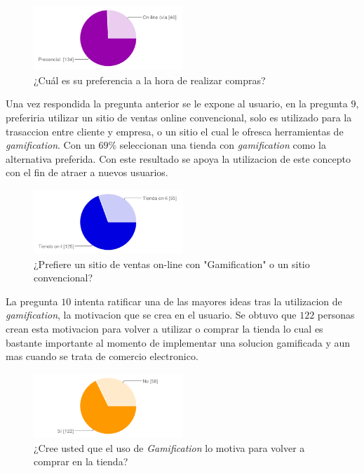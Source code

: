 \begin{figure}[!htb]
  \centering
  \includegraphics[width=0.5\textwidth]{images/chartPreg8.png}
  \caption[chart8]{¿Cuál es su preferencia a la hora de realizar compras?}
  \label{fig:chart2}
\end{figure} 

Una vez respondida la pregunta anterior se le expone al usuario, en la pregunta $9$,  preferiria 
utilizar un sitio de ventas online convencional, solo es utilizado para la trasaccion entre cliente 
y empresa, o un sitio el cual le ofresca herramientas de \emph{gamification}. Con un $69\%$ seleccionan
una tienda con \emph{gamification} como la alternativa preferida. Con este resultado se apoya la 
utilizacion de este concepto con el fin de atraer a nuevos usuarios.

\begin{figure}[!htb]
  \centering
  \includegraphics[width=0.5\textwidth]{images/chartPreg9.png}
  \caption[chart9]{¿Prefiere un sitio de ventas on-line con "Gamification" o un sitio convencional?}
  \label{fig:chart2}
\end{figure}
 
La pregunta $10$ intenta ratificar una de las mayores ideas tras la utilizacion de \emph{gamification}, 
la motivacion que se crea en el usuario. Se obtuvo que $122$ personas crean esta motivacion
para volver a utilizar o comprar la tienda lo cual es bastante importante al momento de implementar
una solucion gamificada y aun mas cuando se trata de comercio electronico.

\begin{figure}[!htb]
  \centering
  \includegraphics[width=0.5\textwidth]{images/chartPreg10.png}
  \caption[chart10]{¿Cree usted que el uso de \emph{Gamification} lo motiva para volver a comprar en la tienda?}
  \label{fig:chart2}
\end{figure}

